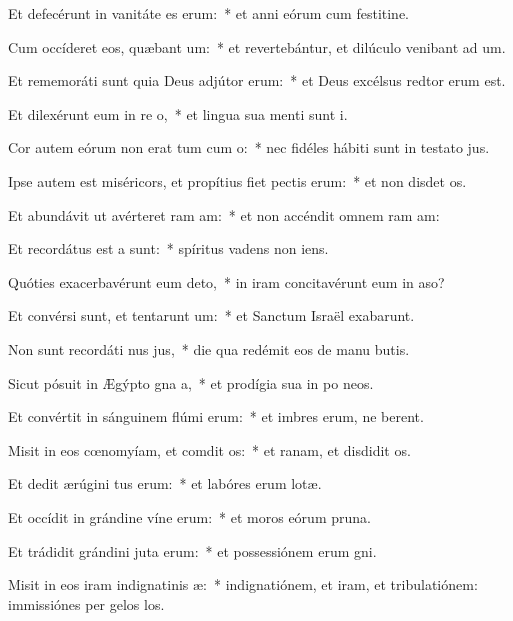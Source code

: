 \item Et defecérunt in vanitáte es erum:~* et anni eórum cum festitine.
\item Cum occíderet eos, quæbant um:~* et revertebántur, et dilúculo venibant ad um.
\item Et rememoráti sunt quia Deus adjútor  erum:~* et Deus excélsus redtor erum est.
\item Et dilexérunt eum in re o,~* et lingua sua menti sunt i.
\item Cor autem eórum non erat tum cum o:~* nec fidéles hábiti sunt in testato jus.
\item Ipse autem est miséricors, et propítius fiet pectis erum:~* et non disdet os.
\item Et abundávit ut avérteret ram am:~* et non accéndit omnem ram am:
\item Et recordátus est a  sunt:~* spíritus vadens  non iens.
\item Quóties exacerbavérunt eum  deto,~* in iram concitavérunt eum in aso?
\item Et convérsi sunt, et tentarunt um:~* et Sanctum Israël exabarunt.
\item Non sunt recordáti nus jus,~* die qua redémit eos de manu butis.
\item Sicut pósuit in Ægýpto gna a,~* et prodígia sua in po neos.
\item Et convértit in sánguinem flúmi erum:~* et imbres erum, ne berent.
\item Misit in eos cœnomyíam, et comdit os:~* et ranam, et disdidit os.
\item Et dedit ærúgini tus erum:~* et labóres erum lotæ.
\item Et occídit in grándine víne erum:~* et moros eórum  pruna.
\item Et trádidit grándini juta erum:~* et possessiónem erum gni.
\item Misit in eos iram indignatinis æ:~* indignatiónem, et iram, et tribulatiónem: immissiónes per gelos los.

